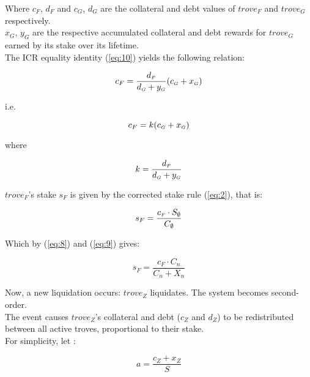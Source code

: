 \documentclass[reqno]{article}
\begin{document}
\bigskip
Where $c_F$, $d_F$ and $c_G$, $d_G$ are the collateral and debt values of $trove_F$ and $trove_G$ respectively.\\

$x_G$, $y_G$ are the respective accumulated collateral and debt rewards for $trove_G$ earned by its stake over its lifetime.\\

The ICR equality identity (\ref{eq:10}) yields the following relation:

\begin{equation} 
        c_F=\frac{d_\mathsmaller{F}}{d_\mathsmaller{G}+y_\mathsmaller{G}}(c_\mathsmaller{G}+x_\mathsmaller{G})
\end{equation}

\bigskip
i.e.

\begin{equation} \label{eq:14}
    c_F=k(c_\mathsmaller{G}+x_\mathsmaller{G})
\end{equation}

\bigskip
where

\begin{equation} \label{eq:15}
    k=\frac{d_\mathsmaller{F}}{d_\mathsmaller{G}+y_\mathsmaller{G}}
\end{equation}


\bigskip
$trove_F$’s stake $s_F$ is given by the corrected stake rule (\ref{eq:2}), that is:

\begin{equation} 
    s_F=\frac{c_\mathsmaller{F} \cdot S_\emptyset}{C_\emptyset}
\end{equation}

\bigskip
Which by (\ref{eq:8}) and (\ref{eq:9}) gives:

\begin{equation} \label{eq:17}
    s_F=\frac{c_F \cdot C_n}{C_n+X_n}
\end{equation}

\bigskip
Now, a new liquidation occurs: $trove_Z$ liquidates. The system becomes second-order.\\

The event causes $trove_Z$’s collateral and debt ($c_Z$ and $d_Z$) to be redistributed between all active troves, proportional to their stake.\\

For simplicity, let :

\begin{equation} 
    a=\frac{c_Z+x_Z}{S}
\end{equation}
\end{document}
